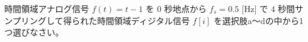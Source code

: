 時間領域アナログ信号 $f(t) = t-1$ を $0$ 秒地点から $f_s = 0.5$ [Hz] で $4$ 秒間サンプリングして得られた時間領域ディジタル信号 $f[i]$ を選択肢a〜dの中から1つ選びなさい。
